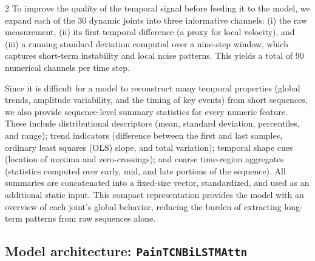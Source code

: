 \documentclass[11pt]{article}
\begin{document}
\begin{multicols}{2}
        To improve the quality of the temporal signal before feeding it to the model, we expand each of the 30 dynamic joints into three informative channels: (i) the raw measurement, (ii) its first temporal difference (a proxy for local velocity), and (iii) a running standard deviation computed over a nine-step window, which captures short-term instability and local noise patterns. This yields a total of 90 numerical channels per time step.

        Since it is difficult for a model to reconstruct many temporal properties (global trends, amplitude variability, and the timing of key events) from short sequences, we also provide sequence-level summary statistics for every numeric feature. These include distributional descriptors (mean, standard deviation, percentiles, and range); trend indicators (difference between the first and last samples, ordinary least squares (OLS) slope, and total variation); temporal shape cues (location of maxima and zero-crossings); and coarse time-region aggregates (statistics computed over early, mid, and late portions of the sequence). All summaries are concatenated into a fixed-size vector, standardized, and used as an additional static input. This compact representation provides the model with an overview of each joint's global behavior, reducing the burden of extracting long-term patterns from raw sequences alone.

        \vspace{-1em}

        \subsection*{Model architecture: \texttt{PainTCNBiLSTMAttn}}
        

\end{multicols}
\end{document}
